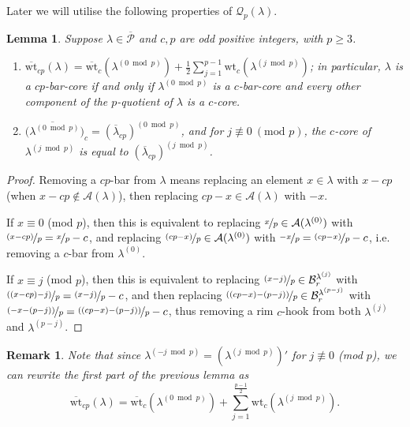 \documentclass[10pt]{amsart}
\newtheorem{lemm}[prop]{Lemma}
\newtheorem*{rema*}{Remark}
\begin{document}
Later we will utilise the following properties of $\mathcal{Q}_p(\lambda)$. 
\begin{lemm}\label{lem3}
Suppose $\lambda\in\overline{\mathcal{P}}$ and $c,p$ are odd positive integers, with $p\geq 3$. 
\begin{enumerate}
\item $\overline{\text{wt}}_{cp}(\lambda)=\overline{\text{wt}}_{c}(\lambda^{(0\bmod p)})+\tfrac{1}{2}\sum_{j=1}^{p-1}\text{wt}_c(\lambda^{(j\bmod p)})$; in particular, $\lambda$ is a $cp$-bar-core if and only if $\lambda^{(0\bmod p)}$ is a $c$-bar-core and every other component of the $p$-quotient of $\lambda$ is a $c$-core. 
\item ${\overline{(\lambda^{(0\bmod p)}})}_c=(\overline{\lambda}_{cp})^{(0\bmod p)}$, and for $j\not\equiv0\:(\text{mod }p)$, the $c$-core of $\lambda^{(j\bmod p)}$ is equal to $(\overline{\lambda}_{cp})^{(j\bmod p)}$.
\end{enumerate}
\end{lemm}
\begin{proof}
Removing a $cp$-bar from $\lambda$ means replacing an element $x\in\lambda$ with $x-cp$ (when $x-cp\not\in\mathcal{A}(\lambda)$), then replacing $cp-x\in\mathcal{A}(\lambda)$ with $-x$. 

If $x\equiv0$ (mod $p$), then this is equivalent to replacing $\nicefrac{x}{p}\in\mathcal{A}(\lambda^{(0)})$ with $\nicefrac{(x-cp)}{p}=\nicefrac{x}{p}-c$, and replacing $\nicefrac{(cp-x)}{p}\in\mathcal{A}(\lambda^{(0)})$ with $\nicefrac{-x}{p}=\nicefrac{(cp-x)}{p}-c$, i.e. removing a $c$-bar from $\lambda^{(0)}$. 

If $x\equiv j$ (mod $p$), then this is equivalent to replacing $\nicefrac{(x-j)}{p}\in\mathcal{B}^{\lambda^{(j)}}_r$ with $\nicefrac{((x-cp)-j)}{p}=\nicefrac{(x-j)}{p}-c$, and then replacing $\nicefrac{((cp-x)-(p-j))}{p}\in\mathcal{B}^{\lambda^{(p-j)}}_r$ with $\nicefrac{(-x-(p-j))}{p}=\nicefrac{((cp-x)-(p-j))}{p}-c$, thus removing a rim $c$-hook from both $\lambda^{(j)}$ and $\lambda^{(p-j)}$.
\end{proof}

\begin{rema*}
Note that since $\lambda^{(-j\bmod p)}=(\lambda^{(j\bmod p)})'$ for $j\not\equiv0$ (mod $p$), we can rewrite the first part of the previous lemma as 
$$\overline{\text{wt}}_{cp}(\lambda)=\overline{\text{wt}}_{c}(\lambda^{(0\bmod p)})+\sum_{j=1}^{\tfrac{p-1}{2}}\text{wt}_c(\lambda^{(j\bmod p)}).$$ 
\end{rema*}
\end{document}
